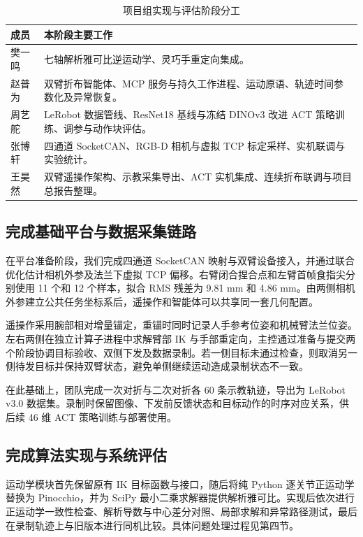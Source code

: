 \documentclass[UTF8,a4paper,zihao=-4]{ctexart}
\begin{document}
\begin{table}[H]
\centering
\small
\renewcommand{\arraystretch}{1.35}
\begin{tabularx}{\textwidth}{@{}p{1.3cm}Y@{}}
\toprule
成员 & 本阶段主要工作\\
\midrule
樊一鸣 & 七轴解析雅可比逆运动学、灵巧手重定向集成。\\
赵普为 & 双臂折布智能体、MCP 服务与持久工作进程、运动原语、轨迹时间参数化及异常恢复。\\
周艺舵 & LeRobot 数据管线、ResNet18 基线与冻结 DINOv3 改进 ACT 策略训练、调参与动作块评估。\\
张博轩 & 四通道 SocketCAN、RGB-D 相机与虚拟 TCP 标定采样、实机联调与实验统计。\\
王昊然 & 双臂遥操作架构、示教采集导出、ACT 实机集成、连续折布联调与项目总报告整理。\\
\bottomrule
\end{tabularx}
\caption{项目组实现与评估阶段分工}
\end{table}

\subsection{完成基础平台与数据采集链路}

在平台准备阶段，我们完成四通道 SocketCAN 映射与双臂设备接入，并通过联合优化估计相机外参及法兰下虚拟 TCP 偏移。右臂闭合捏合点和左臂首帧食指尖分别使用 11 个和 12 个样本，拟合 RMS 残差为 9.81 mm 和 4.86 mm。由两侧相机外参建立公共任务坐标系后，遥操作和智能体可以共享同一套几何配置。

遥操作采用腕部相对增量锚定，重锚时同时记录人手参考位姿和机械臂法兰位姿。左右两侧在独立计算子进程中求解臂部 IK 与手部重定向，主控通过准备与提交两个阶段协调目标验收、双侧下发及数据录制。若一侧目标未通过检查，则取消另一侧待发目标并保持双臂状态，避免单侧继续运动造成录制状态不一致。

在此基础上，团队完成一次对折与二次对折各 60 条示教轨迹，导出为 LeRobot v3.0 数据集。录制时保留图像、下发前反馈状态和目标动作的时序对应关系，供后续 46 维 ACT 策略训练与部署使用。

\subsection{完成算法实现与系统评估}

运动学模块首先保留原有 IK 目标函数与接口，随后将纯 Python 逐关节正运动学替换为 Pinocchio，并为 SciPy 最小二乘求解器提供解析雅可比。实现后依次进行正运动学一致性检查、解析导数与中心差分对照、局部求解和异常路径测试，最后在录制轨迹上与旧版本进行同机比较。具体问题处理过程见第四节。
\end{document}
